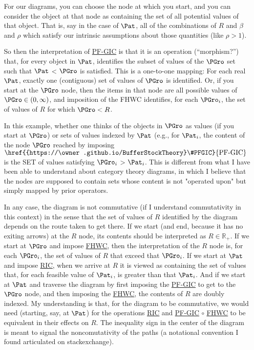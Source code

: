 \documentclass[\econtexRoot/BufferStockTheory]{subfiles}
\newcommand{\BSTlinkTo}{https://\owner.github.io/BufferStockTheory}
\renewcommand{\FHWC}{\href{{\BSTlinkTo}FHWC}{\textrm{FHWC}}}
\renewcommand{\FHWC}{\href{{\BSTlinkTo}\#FHWC}{\textrm{FHWC}}}
\renewcommand{\PFGIC}{\href{{\BSTlinkTo}\#PFGIC}{\textrm{PF-GIC}}}
\renewcommand{\RIC}{\href{{\BSTlinkTo}\#RIC}{\textrm{RIC}}}
\begin{document}
\begin{CDCPrivate}
  For our diagrams, you can choose the node at which you start, and you can consider the object at that node as containing the set of all potential values of that object. That is, say in the case of $\Pat$, all of the combinations of ${R}$ and ${\beta}$ and ${\rho}$ which satisfy our intrinsic assumptions about those quantities (like ${\rho} > 1$).

So then the interpretation of {\PFGIC} is that it is an operation (``morphism?'') that, for every object in $\Pat$, identifies the subset of values of the $\PGro$ set such that $\Pat$ < $\PGro$ is satisfied. This is a one-to-one mapping: For each real $\Pat$, exactly one (contiguous) set of values of $\PGro$ is identified. Or, if you start at the $\PGro$ node, then the items in that node are all possible values of $\PGro \in (0,\infty)$, and imposition of the FHWC identifies, for each $\PGro_{i}$, the set of values of ${R}$ for which $\PGro < {R}$.

In this example, whether one thinks of the objects in $\PGro$ as values (if you start at $\PGro$) or sets of values indexed by $\Pat$ (e.g., for $\Pat_i$, the content of the node $\PGro$ reached by imposing $\PFGIC$ is the SET of values satisfying $\PGro_{i} $ > $\Pat_i$. This is different from what I have been able to understand about category theory diagrams, in which I believe that the nodes are supposed to contain sets whose content is not "operated upon" but simply mapped by prior operators.

In any case, the diagram is not commutative (if I understand commutativity in this context) in the sense that the set of values of ${R}$ identified by the diagram depends on the route taken to get there.  If we start (and end, because it has no exiting arrows) at the ${R}$ node, its contents should be interpreted as ${R} \in \mathbb{R}_{+}$.  If we start at $\PGro$ and impose {\FHWC}, then the interpretation of the ${R}$ node is, for each $\PGro_{i}$, the set of values of ${R}$ that exceed that $\PGro_{i}$.  If we start at $\Pat$ and impose {\RIC}, when we arrive at ${R}$ it is viewed as containing the set of values that, for each feasible value of $\Pat_{i}$, is greater than that $\Pat_{i}$. And if we start at $\Pat$ and traverse the diagram by first imposing the {\PFGIC} to get to the $\PGro$ node, and then imposing the {\FHWC}, the contents of ${R}$ are doubly indexed. My understanding is that, for the diagram to be commutative, we would need (starting, say, at $\Pat$) for the operations {\RIC} and {\PFGIC} $\circ$ {\FHWC} to be equivalent in their effects on ${R}$. The inequality sign in the center of the diagram is meant to signal the noncomutativity of the paths (a notational convention I found articulated on stackexchange).


\end{CDCPrivate}
\end{document}
